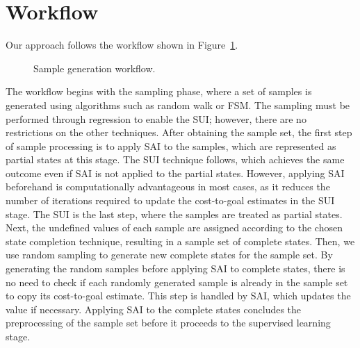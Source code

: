 \section{Workflow}
\label{sec:workflow}

Our approach follows the workflow shown in Figure~\ref{fig:workflow}.

\begin{figure}[ht]
    \caption{Sample generation workflow.}
    \label{fig:workflow}
    \addvspace{\baselineskip}
    \centering
\end{figure}

The workflow begins with the sampling phase, where a set of samples is generated using algorithms such as random walk or FSM. The sampling must be performed through regression to enable the SUI; however, there are no restrictions on the other techniques.
After obtaining the sample set, the first step of sample processing is to apply SAI to the samples, which are represented as partial states at this stage. The SUI technique follows, which achieves the same outcome even if SAI is not applied to the partial states. However, applying SAI beforehand is computationally advantageous in most cases, as it reduces the number of iterations required to update the cost-to-goal estimates in the SUI stage.
The SUI is the last step, where the samples are treated as partial states. Next, the undefined values of each sample are assigned according to the chosen state completion technique, resulting in a sample set of complete states.
Then, we use random sampling to generate new complete states for the sample set. By generating the random samples before applying SAI to complete states, there is no need to check if each randomly generated sample is already in the sample set to copy its cost-to-goal estimate. This step is handled by SAI, which updates the value if necessary. Applying SAI to the complete states concludes the preprocessing of the sample set before it proceeds to the supervised learning stage.

